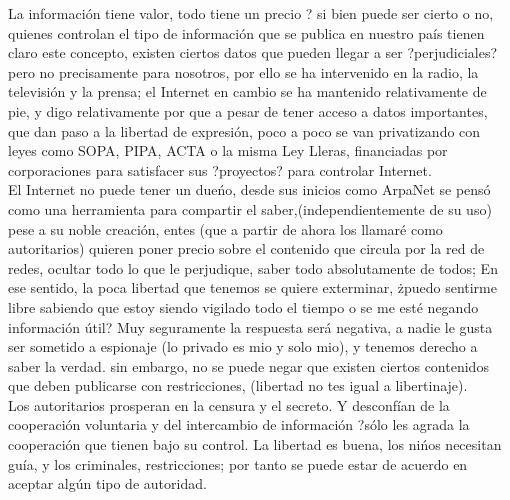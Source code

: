\begin{multicols}{2}

La información tiene valor, todo tiene un precio ? si bien puede ser cierto o no, quienes controlan el tipo 
de información que se publica en nuestro país tienen claro este concepto, existen ciertos datos que pueden 
llegar a ser ?perjudiciales? pero no precisamente para nosotros, por ello se ha intervenido en la radio, la
televisión y la prensa; el Internet en cambio se ha mantenido relativamente  de pie, y  digo relativamente por
que a pesar de tener acceso a datos importantes, que dan paso a la libertad de expresión, poco a poco se van
privatizando con leyes como SOPA, PIPA, ACTA o la misma Ley Lleras, financiadas por corporaciones 
para satisfacer sus ?proyectos? para controlar Internet.\\

El Internet no puede tener un dueńo, desde sus inicios como ArpaNet se pensó como una herramienta para compartir 
el saber,(independientemente de su uso) pese a su noble creación, entes (que a partir de ahora los llamaré como autoritarios) 
quieren poner precio sobre el contenido que circula por la red de redes, ocultar todo lo que le perjudique,
saber todo absolutamente de todos; En ese sentido, la poca libertad que tenemos se quiere exterminar, 
żpuedo sentirme libre sabiendo que estoy siendo vigilado todo el tiempo o se me esté negando información útil? Muy seguramente 
la respuesta será negativa, a nadie le gusta ser sometido a espionaje (lo privado es mio y solo mio),  y tenemos derecho a 
saber la verdad. sin embargo, no se puede negar que existen ciertos contenidos  que deben publicarse con restricciones, 
(libertad no tes igual a libertinaje). \\

Los autoritarios prosperan en la censura y el secreto. Y desconfían de la cooperación voluntaria y del intercambio de información
?sólo les agrada la cooperación que tienen bajo su control. La libertad es buena, los nińos necesitan guía, y los criminales,
restricciones; por tanto se puede estar de acuerdo en aceptar algún tipo de autoridad.\\







\end{multicols}
